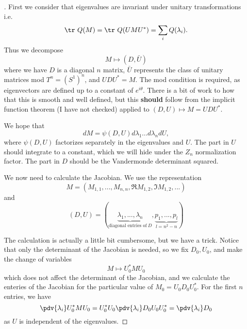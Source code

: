 \begin{proof}[]
    First we consider that eigenvalues are invariant under unitary transformations i.e. \[
     \tr \ Q(M) = \tr \ Q(UMU^*)=\sum_i Q(\lambda_i).
    \]
    Thus we decompose \[
    M \mapsto (D,\bar{U})
    \]
    where we have $D$ is a diagonal $n$ matrix, $\bar{U}$ represents the class of unitary matrices mod $T^n = (S^1)^n$, and $UDU^* = M$. The mod condition is required, as eigenvectors are defined up to a constant of $e^{i\theta}$. There is a bit of work to how that this is smooth and well defined, but this \textbf{should} follow from the implicit function theorem (I have not checked) applied to $(D,U)\mapsto M=UDU^*$.

    We hope that \[
    dM = \psi(D,U) d\lambda_1 ... d\lambda_n dU,
    \]
    where $\psi(D,U)$ factorizes separately in the eigenvalues and $U$. The part in $U$ should integrate to a constant, which we will hide under the $Z_n$ normalization factor. The part in $D$ should be the Vandermonde determinant squared.

    We now need to calculate the Jacobian. We use the representation \[M = (M_{1,1},...,M_{n,n},\Re M_{1,2}, \Im M_{1,2},...)\]
    and \[
    (D,U) = (\underbrace{\lambda_1,...,\lambda_n}_{\text{diagonal entries of}\ D},\underbrace{p_1,...,p_l}_{l=n^2-n})
    \]

    The calculation is actually a little bit cumbersome, but we have a trick. Notice that only the determinant of the Jacobian is needed, so we fix $D_0, U_0$, and make the change of variables \[
    M \mapsto U_0^* M U_0 
    \]
    which does not affect the determinant of the Jacobian, and we calculate the enteries of the Jacobian for the particular value of $M_0=U_0D_0U_0^*$.
    For the first $n$ entries, we have \[
    \pdv{\lambda_i}U_0^*MU_0   =  U_0^*U_0 \pdv{\lambda_i} D_0 U_0U_0^* = \pdv{\lambda_i} D_0
    \]
    as $U$ is independent of the eigenvalues.
    

\end{proof}
